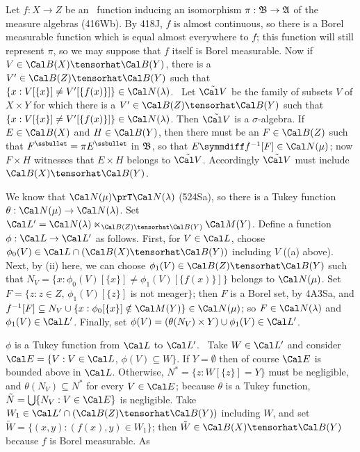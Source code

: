 {\medskip

 Let $f:X\to Z$ be an \imp\ function inducing an
isomorphism $\pi:\frak B\to\frak A$ of the measure algebras (416Wb).
By 418J, $f$ is almost
continuous, so there is a Borel measurable function which is equal
almost everywhere to $f$;  this function will still represent $\pi$, so
we may suppose that $f$ itself is Borel
measurable.   Now if $V\in\Cal B(X)\tensorhat\Cal B(Y)$, there is a
$V'\in\Cal B(Z)\tensorhat\Cal B(Y)$ such that
$\{x:V[\{x\}]\ne V'[\{f(x)\}]\}\in\Cal N(\lambda)$.
\Prf\ Let $\tilde{\Cal V}$ be the family of subsets $V$ of $X\times Y$
for which there is a $V'\in\Cal B(Z)\tensorhat\Cal B(Y)$ such that
$\{x:V[\{x\}]\ne V'[\{f(x)\}]\}\in\Cal N(\lambda)$.
Then $\tilde{\Cal V}$ is a $\sigma$-algebra.   If $E\in\Cal B(X)$ and
$H\in\Cal B(Y)$,
then there must be an $F\in\Cal B(Z)$ such that
$F^{\ssbullet}=\pi E^{\ssbullet}$ in $\frak B$, so that
$E\symmdiff f^{-1}[F]\in\Cal N(\mu)$;  now $F\times H$ witnesses that
$E\times H$
belongs to $\tilde{\Cal V}$.   Accordingly $\tilde{\Cal V}$ must include
$\Cal B(X)\tensorhat\Cal B(Y)$.\ \Qed

\medskip

 We know that $\Cal N(\mu)\prT\Cal N(\lambda)$
(524Sa), so there is a Tukey function
$\theta:\Cal N(\mu)\to\Cal N(\lambda)$.   Set
$\Cal L'=\Cal N(\lambda)\ltimes_{\Cal B(Z)\tensorhat\Cal B(Y)}\Cal M(Y)$.
Define a function $\phi:\Cal L\to\Cal L'$ as
follows.   First, for $V\in\Cal L$, choose
$\phi_0(V)\in\Cal L\cap(\Cal B(X)\tensorhat\Cal B(Y))$ including $V$
((a) above).   Next, by (ii) here, we can
choose $\phi_1(V)\in\Cal B(Z)\tensorhat\Cal B(Y)$
such that $N_V=\{x:\phi_0(V)[\{x\}]\ne\phi_1(V)[\{f(x)\}]\}$ belongs to
$\Cal N(\mu)$.   Set
$F=\{z:z\in Z$, $\phi_1(V)[\{z\}]$ is not meager$\}$;
then $F$ is a Borel set, by 4A3Sa, and
$f^{-1}[F]\subseteq N_V\cup\{x:\phi_0[\{x\}]\notin\Cal M(Y)\}\in\Cal N(\mu)$;
so $F\in\Cal N(\lambda)$ and $\phi_1(V)\in\Cal L'$.
Finally, set
$\phi(V)=(\theta(N_V)\times Y)\cup\phi_1(V)\in\Cal L'$.

$\phi$ is a Tukey function from $\Cal L$ to $\Cal L'$.   \Prf\ Take
$W\in\Cal L'$ and consider $\Cal E=\{V:V\in\Cal L$, $\phi(V)\subseteq
W\}$.
If $Y=\emptyset$ then of course $\Cal E$ is bounded above in $\Cal L$.
Otherwise, $N^*=\{z:W[\{z\}]=Y\}$ must be negligible, and
$\theta(N_V)\subseteq N^*$ for every $V\in\Cal E$;
because $\theta$ is a
Tukey function, $\tilde N=\bigcup\{N_V:V\in\Cal E\}$ is negligible.
Take $W_1\in\Cal L'\cap(\Cal B(Z)\tensorhat\Cal B(Y))$ including $W$,
and set $\tilde W=\{(x,y):(f(x),y)\in W_1\}$;
then $\tilde W\in\Cal B(X)\tensorhat\Cal B(Y)$ because $f$ is Borel
measurable.   As

}
